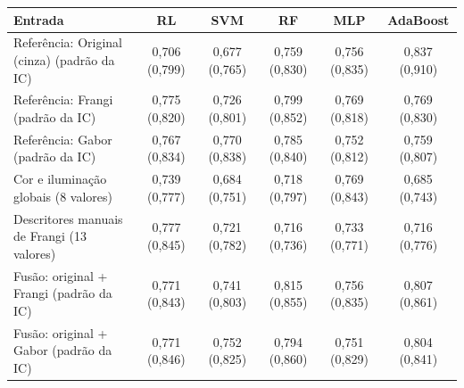 \begin{tabular}{lccccc}
\toprule
Entrada & RL & SVM & RF & MLP & AdaBoost \\
\midrule
Referência: Original (cinza) (padrão da IC) & 0,706 (0,799) & 0,677 (0,765) & 0,759 (0,830) & 0,756 (0,835) & 0,837 (0,910) \\
Referência: Frangi (padrão da IC) & 0,775 (0,820) & 0,726 (0,801) & 0,799 (0,852) & 0,769 (0,818) & 0,769 (0,830) \\
Referência: Gabor (padrão da IC) & 0,767 (0,834) & 0,770 (0,838) & 0,785 (0,840) & 0,752 (0,812) & 0,759 (0,807) \\
\midrule
Cor e iluminação globais (8 valores) & 0,739 (0,777) & 0,684 (0,751) & 0,718 (0,797) & 0,769 (0,843) & 0,685 (0,743) \\
Descritores manuais de Frangi (13 valores) & 0,777 (0,845) & 0,721 (0,782) & 0,716 (0,736) & 0,733 (0,771) & 0,716 (0,776) \\
Fusão: original + Frangi (padrão da IC) & 0,771 (0,843) & 0,741 (0,803) & 0,815 (0,855) & 0,756 (0,835) & 0,807 (0,861) \\
Fusão: original + Gabor (padrão da IC) & 0,771 (0,846) & 0,752 (0,825) & 0,794 (0,860) & 0,751 (0,829) & 0,804 (0,841) \\
\bottomrule
\end{tabular}
